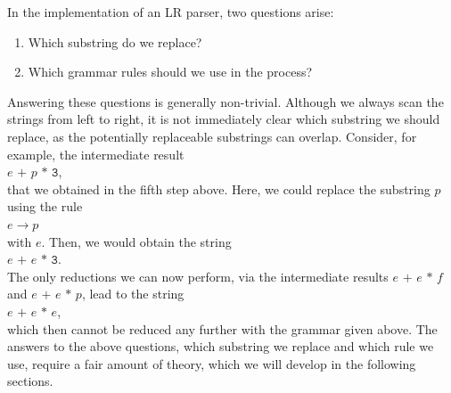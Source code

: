 \noindent
In the implementation of an LR parser, two questions arise:
\begin{enumerate}
\item Which substring do we replace?
\item Which grammar rules should we use in the process?
\end{enumerate}
Answering these questions is generally non-trivial. Although we always scan the strings from left to right, it is not immediately clear which substring we should replace, as the potentially replaceable substrings can overlap. Consider, for example, the intermediate result
\\[0.2cm]
\hspace*{1.3cm}
\(e \texttt{ + } p \texttt{ * 3}\),
\\[0.2cm]
that we obtained in the fifth step above.
Here, we could replace the substring \(p\) using the rule
\\[0.2cm]
\hspace*{1.3cm}
\(e \rightarrow p\)
\\[0.2cm]
with \(e\). Then, we would obtain the string
\\[0.2cm]
\hspace*{1.3cm}
\(e \texttt{ + } e \texttt{ * 3}\).
\\[0.2cm]
The only reductions we can now perform, via the intermediate results \(e \texttt{ + } e \texttt{ * } f\) and
\(e \texttt{ + } e \texttt{ * } p\), lead to the string 
\\[0.2cm]
\hspace*{1.3cm}
\(e \texttt{ + } e \texttt{ * } e\),
\\[0.2cm]
which then cannot be reduced any further with the grammar given above. The answers to the above questions,
which substring we replace and which rule we use, require a fair amount of theory, which we will develop in the
following sections. 

